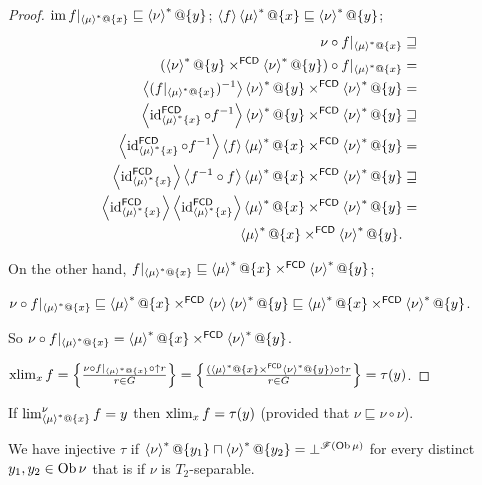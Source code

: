 \begin{proof}
$\im f|_{\rsupfun{\mu}@\{x\}}\sqsubseteq\rsupfun{\nu}@\{y\}$;
$\supfun f\rsupfun{\mu}@\{x\}\sqsubseteq\rsupfun{\nu}@\{y\}$;
\begin{align*}
\nu\circ f|_{\rsupfun{\mu}@\{x\}} & \sqsupseteq\\
(\rsupfun{\nu}@\{y\}\times^{\mathsf{FCD}}\rsupfun{\nu}@\{y\})\circ f|_{\rsupfun{\mu}@\{x\}} & =\\
\supfun{(f|_{\rsupfun{\mu}@\{x\}})^{-1}}\rsupfun{\nu}@\{y\}\times^{\mathsf{FCD}}\rsupfun{\nu}@\{y\} & =\\
\supfun{\id_{\rsupfun{\mu}\{x\}}^{\mathsf{FCD}}\circ f^{-1}}\rsupfun{\nu}@\{y\}\times^{\mathsf{FCD}}\rsupfun{\nu}@\{y\} & \sqsupseteq\\
\supfun{\id_{\rsupfun{\mu}\{x\}}^{\mathsf{FCD}}\circ f^{-1}}\supfun f\rsupfun{\mu}@\{x\}\times^{\mathsf{FCD}}\rsupfun{\nu}@\{y\} & =\\
\supfun{\id_{\rsupfun{\mu}\{x\}}^{\mathsf{FCD}}}\supfun{f^{-1}\circ f}\rsupfun{\mu}@\{x\}\times^{\mathsf{FCD}}\rsupfun{\nu}@\{y\} & \sqsupseteq\\
\supfun{\id_{\rsupfun{\mu}\{x\}}^{\mathsf{FCD}}}\supfun{\id_{\rsupfun{\mu}\{x\}}^{\mathsf{FCD}}}\rsupfun{\mu}@\{x\}\times^{\mathsf{FCD}}\rsupfun{\nu}@\{y\} & =\\
\rsupfun{\mu}@\{x\}\times^{\mathsf{FCD}}\rsupfun{\nu}@\{y\}.
\end{align*}


On the other hand, $f|_{\rsupfun{\mu}@\{x\}}\sqsubseteq\rsupfun{\mu}@\{x\}\times^{\mathsf{FCD}}\rsupfun{\nu}@\{y\}$;

$\nu\circ f|_{\rsupfun{\mu}@\{x\}}\sqsubseteq\rsupfun{\mu}@\{x\}\times^{\mathsf{FCD}}\supfun{\nu}\rsupfun{\nu}@\{y\}\sqsubseteq\rsupfun{\mu}@\{x\}\times^{\mathsf{FCD}}\rsupfun{\nu}@\{y\}$.

So $\nu\circ f|_{\rsupfun{\mu}@\{x\}}=\rsupfun{\mu}@\{x\}\times^{\mathsf{FCD}}\rsupfun{\nu}@\{y\}$.

$\xlim_{x}f=\setcond{\nu\circ f|_{\rsupfun{\mu}@\{x\}}\circ\uparrow r}{r\in G}=\setcond{(\rsupfun{\mu}@\{x\}\times^{\mathsf{FCD}}\rsupfun{\nu}@\{y\})\circ\uparrow r}{r\in G}=\tau(y)$.\end{proof}
\begin{cor}
If $\lim_{\rsupfun{\mu}@\{x\}}^{\nu}f=y$ then $\xlim_{x}f=\tau(y)$ (provided that $\nu\sqsubseteq\nu\circ\nu$).
\end{cor}
We have injective $\tau$ if $\rsupfun{\nu}@\{y_{1}\}\sqcap\rsupfun{\nu}@\{y_{2}\}=\bot^{\mathscr{F}(\Ob\mu)}$
for every distinct $y_{1},y_{2}\in\Ob\nu$ that is if $\nu$ is $T_{2}$-separable.
